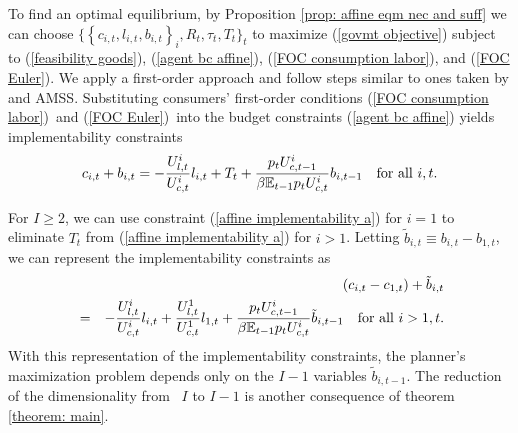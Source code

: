 \documentclass[11.5pt,twoside]{article}
\begin{document}
To find an optimal equilibrium, by Proposition  \ref{prop: affine eqm nec and suff}
we can choose $\{ \left \{ c_{i,t},l_{i,t},b_{i,t}\right \} _{i},R_{t},\tau
_{t},T_{t}\}_{t}$ to maximize (\ref{govmt objective}) subject to (\ref{feasibility goods}), (\ref{agent bc affine}), (\ref{FOC consumption labor}), and (\ref{FOC Euler}).
We  apply a first-order approach and follow steps similar to ones taken by \cite{LucasJr.1983} and AMSS.
 Substituting consumers' first-order
conditions (\ref{FOC consumption labor})\ and (\ref{FOC Euler})\ into the
budget constraints (\ref{agent bc affine}) yields implementability
constraints%
\begin{equation}
c_{i,t}+b_{i,t}=-\frac{U_{l,t}^{i}}{U_{c,t}^{i}}l_{i,t}+T_{t}+\frac{%
p_tU_{c,t-1}^{i}}{\beta \mathbb{E}_{t-1}p_tU_{c,t}^{i}}b_{i,t-1}\ \text{for\ all\ }%
i,t.  \label{affine implementability a}
\end{equation}

\noindent For $I\geq 2$, we can use constraint (\ref{affine implementability
a}) for  $i=1$ to eliminate $T_{t}$ from (\ref{affine implementability a}) for $i > 1$. Letting $\tilde{b}%
_{i,t}\equiv b_{i,t}-b_{1,t}$, we can represent the implementability constraints
as
\begin{eqnarray}
\label{affine implementability b} 
&&\left( c_{i,t}-c_{1,t}\right) +\tilde{b}_{i,t}\\
&=&-\frac{U_{l,t}^{i}}{U_{c,t}^{i}}l_{i,t}+\frac{U^1_{l,t}}{U^1_{c,t}}l_{1,t} +\frac{p_tU_{c,t-1}^{i}}{\beta \mathbb{E}%
_{t-1}p_tU_{c,t}^{i}}\tilde{b}_{i,t-1}\ \text{for\ all\ }i>1,t.  \notag
\end{eqnarray}
\noindent With this representation of the implementability constraints, the planner's
maximization problem depends only on the $I-1$ variables $\tilde{b}_{i,t-1}.$
The reduction of  the dimensionality from \ $I$ to $I-1$ is
 another consequence of theorem \ref{theorem: main}.

 
\end{document}
